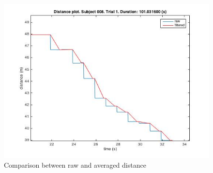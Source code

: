 \documentclass[journal]{IEEEtran}
\begin{document}
\begin{figure}[h!]
 \centering		
   \includegraphics[scale=0.5]{graphics/rawvsfiltered.jpg}		
 \caption{Comparison between raw and averaged distance}		
  \label{fig:rawvsfiltered}		
\end{figure}



\end{document}
